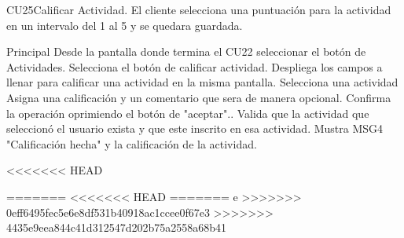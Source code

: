 
\begin{UseCase}{CU25}{Calificar Actividad.}{
		El cliente selecciona una puntuación para la actividad en un intervalo del 1 al 5 y se quedara guardada.
	}
\end{UseCase}

\begin{UCtrayectoria}{Principal}
	\UCpaso[\UCactor] Desde la pantalla donde termina el CU22 seleccionar el botón de Actividades.
	\UCpaso[\UCactor] Selecciona el botón de calificar actividad.
	\UCpaso Despliega los campos a llenar para calificar una actividad en la misma pantalla.
	\UCpaso[\UCactor] Selecciona una actividad
	\UCpaso[\UCactor] Asigna una calificación y un comentario que sera de manera opcional.
	\UCpaso[\UCactor] Confirma la operación oprimiendo el botón de "aceptar"..
	\UCpaso Valida que la actividad que seleccionó el usuario exista y que este inscrito en esa actividad.
	\UCpaso Mustra MSG4 "Calificación hecha" y la calificación de la actividad.
	
\end{UCtrayectoria}

<<<<<<< HEAD

=======
<<<<<<< HEAD
=======
e%
>>>>>>> 0eff6495fec5e6e8df531b40918ac1ccee0f67e3
>>>>>>> 4435e9eea844c41d312547d202b75a2558a68b41



